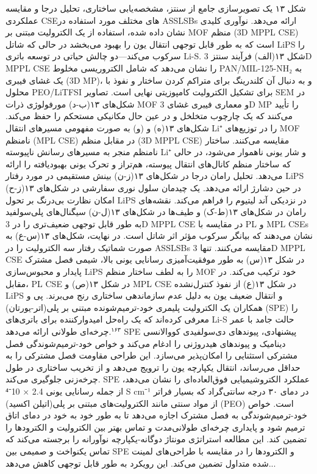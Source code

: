 \documentclass[12pt,a4paper,twocolumn]{article} %
\newcommand{\persian}[1]{\textfarsi{#1}}
\newcommand{\english}[1]{\textenglish{#1}}
\begin{document}
\persian{
شکل ۱۳ یک تصویرسازی جامع از سنتز، مشخصه‌یابی ساختاری، تحلیل درجا و مقایسه عملکردی \english{CSE}های مختلف مورد استفاده در \english{ASSLSBs} ارائه می‌دهد. نوآوری کلیدی نشان داده شده، استفاده از یک الکترولیت مبتنی بر \english{MOF} منظم (\english{3D MPPL CSE}) است که به طور قابل توجهی انتقال یون را بهبود می‌بخشد در حالی که شاتل \english{LiPS} را سرکوب می‌کند—دو چالش حیاتی در توسعه باتری \english{Li-S}. شکل ۱۳(الف) فرآیند سنتز \english{3D MPPL CSE} را نشان می‌دهد که شامل الکتروریسی مخلوط \english{PAN/MIL-125-NH₂} به یک غشای فیبری (\english{3D MP})، و به دنبال آن کلندرینگ برای متراکم کردن ساختار و نفوذ با محلول \english{PEO/LiTFSI} برای تشکیل الکترولیت کامپوزیتی نهایی است. تصاویر \english{SEM} در شکل‌های ۱۳(ب-د) مورفولوژی ذرات \english{MOF} و معماری فیبری غشای \english{3D MP} را تأیید می‌کنند که یک چارچوب متخلخل و در عین حال مکانیکی مستحکم را حفظ می‌کند. شکل‌های ۱۳(ه) و (و) به صورت مفهومی مسیرهای انتقال \english{Li⁺} را در توزیع‌های \english{MOF} نامنظم (\english{MPL CSE}) در مقابل منظم (\english{3D MPPL CSE}) مقایسه می‌کنند. ساختار نامنظم منجر به مسیرهای رسانش ناپیوسته \english{Li⁺} و شار یونی ناهموار می‌شود، در حالی که ساختار منظم کانال‌های انتقال پیوسته، هم‌تراز و تحرک یونی بهبودیافته را ارائه می‌دهد. تحلیل رامان درجا در شکل‌های ۱۳(ز-ن) بینش مستقیمی در مورد رفتار \english{LiPS} در حین دشارژ ارائه می‌دهد. یک چیدمان سلول نوری سفارشی در شکل‌های ۱۳(ز-ح) امکان نظارت بی‌درنگ بر تحول \english{LiPS} در نزدیکی آند لیتیوم را فراهم می‌کند. نقشه‌های رامان در شکل‌های ۱۳(ط-ک) و طیف‌ها در شکل‌های ۱۳(ل-ن) سیگنال‌های پلی‌سولفید به طور قابل توجهی ضعیف‌تری را در \english{3D MPPL CSE} در مقایسه با \english{PL} و \english{MPL CSEs} نشان می‌دهند که بیانگر سرکوب مؤثر اثر شاتل است. در نهایت، شکل‌های ۱۳(س-ع) به صورت شماتیک رفتار سه الکترولیت را در \english{ASSLSBs} مقایسه می‌کنند. تنها \english{3D MPPL CSE} در شکل ۱۳(س) به طور موفقیت‌آمیزی رسانایی یونی بالا، شیمی فصل مشترک پایدار و محبوس‌سازی \english{LiPS} را به لطف ساختار منظم \english{MOF} خود ترکیب می‌کند. در مقابل، \english{PL CSE} در شکل ۱۳(ص) و \english{MPL CSE} در شکل ۱۳(ع) از نفوذ کنترل‌نشده \english{LiPS} و انتقال ضعیف یون به دلیل عدم سازماندهی ساختاری رنج می‌برند.
}
\persian{
پی و همکاران یک الکترولیت پلیمری خود-ترمیم‌شونده مبتنی بر پلی(اتر-یورتان) (\english{SPE}) را معرفی کرده‌اند که یک راه‌حل امیدوارکننده برای باتری‌های \english{Li-S} حالت جامد با عمر چرخه‌ای طولانی ارائه می‌دهد.$^{۱۶۳}$ \english{SPE} پیشنهادی، پیوندهای دی‌سولفیدی کووالانسی دینامیک و پیوندهای هیدروژنی را ادغام می‌کند و خواص خود-ترمیم‌شوندگی فصل مشترکی استثنایی را امکان‌پذیر می‌سازد. این طراحی مقاومت فصل مشترکی را به حداقل می‌رساند، انتقال یکپارچه یون را ترویج می‌دهد و از تخریب ساختاری در طول چرخه‌زنی جلوگیری می‌کند. \english{SPE} عملکرد الکتروشیمیایی فوق‌العاده‌ای را نشان می‌دهد، از جمله رسانایی یونی \english{2.4 × 10⁻⁴ S cm⁻¹} در دمای ۳۰ درجه سانتی‌گراد که بسیار فراتر از مواد سنتی مانند الکترولیت‌های مبتنی بر پلی(اتیلن اکسید) (\english{PEO}) است. خواص خود-ترمیم‌شوندگی به فصل مشترک اجازه می‌دهد تا به طور خود به خود در دمای اتاق ترمیم شود و پایداری چرخه‌ای طولانی‌مدت و تماس بهتر بین الکترولیت و الکترودها را تضمین کند. این مطالعه استراتژی مونتاژ دوگانه-یکپارچه نوآورانه را برجسته می‌کند که تماس یکنواخت و صمیمی بین \english{SPE} و الکترودها را در مقایسه با طراحی‌های لمینت شده متداول تضمین می‌کند. این رویکرد به طور قابل توجهی کاهش می‌دهد...
}
\end{document}
